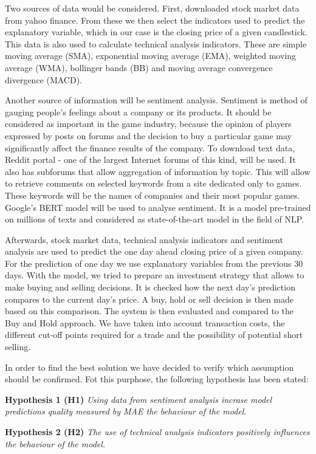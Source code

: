 \documentclass[11pt]{article} %
\begin{document}
Two sources of data would be considered. First, downloaded stock market data from yahoo finance. From these we then select the indicators used to predict the explanatory variable, which in our case is the closing price of a given candlestick. This data is also used to calculate technical analysis indicators. These are simple moving average (SMA), exponential moving average (EMA), weighted moving average (WMA), bollinger bands (BB) and moving average convergence divergence (MACD). 

Another source of information will be sentiment analysis. Sentiment is method of gauging people's feelings about a company or its products. It should be considered as important in the game industry, because the opinion of players expressed by posts on forums and the decision to buy a particular game may significantly affect the finance results of the company. To download text data, Reddit portal - one of the largest Internet forums of this kind, will be used. It also has subforums that allow aggregation of information by topic. This will allow to retrieve comments on selected keywords from a site dedicated only to games. These keywords will be the names of companies and their most popular games. Google's BERT model will be used to analyse sentiment. It is a model pre-trained on millions of texts and considered as state-of-the-art model in the field of NLP. 

Afterwards, stock market data, technical analysis indicators and sentiment analysis are used to predict the one day ahead closing price of a given company. For the prediction of one day we use explanatory variables from the previous 30 days. With the model, we tried to prepare an investment strategy that allows to make buying and selling decisions. It is checked how the next day's prediction compares to the current day's price. A buy, hold or sell decision is then made based on this comparison. The system is then evaluated and compared to the Buy and Hold approach. We have taken into account transaction costs, the different cut-off points required for a trade and the possibility of potential short selling. 

In order to find the best solution we have decided to verify which assumption should be confirmed. Fot this purphose, the following hypothesis has been stated: 

\textbf{Hypothesis 1 (H1)} \textit{Using data from sentiment analysis incrase model predictions quality measured by MAE the behaviour of the model.}

\textbf{Hypothesis 2 (H2)} \textit{The use of technical analysis indicators positively influences the behaviour of the model.}
\end{document}
